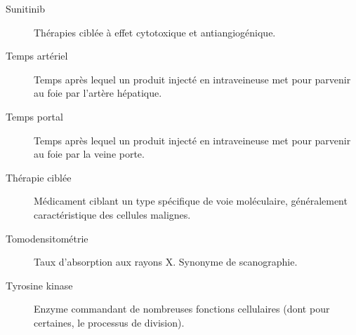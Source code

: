 \documentclass[main.tex]{subfiles}
\begin{document}
\begin{description}
\item[Sunitinib] Thérapies ciblée à effet cytotoxique et antiangiogénique. 
\item[Temps artériel] Temps après lequel un produit injecté en intraveineuse met pour parvenir au foie par l'artère hépatique.
\item[Temps portal] Temps après lequel un produit injecté en intraveineuse met pour parvenir au foie par la veine porte.
\item[Thérapie ciblée] Médicament ciblant un type spécifique de voie moléculaire, généralement caractéristique des cellules malignes. 
\item[Tomodensitométrie] Taux d'absorption aux rayons X. Synonyme de scanographie. 
\item[Tyrosine kinase] Enzyme commandant de nombreuses fonctions cellulaires (dont pour certaines, le processus de division).
\end{description}
\end{document}
